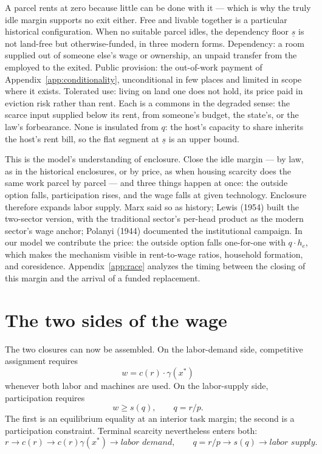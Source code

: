 \documentclass[12pt]{article}
\theoremstyle{plain}
\begin{document}
A parcel rents at zero because little can be done with it --- which is why the truly idle margin supports no exit either. Free and livable together is a particular historical configuration. When no suitable parcel idles, the dependency floor $\underline{s}$ is not land-free but otherwise-funded, in three modern forms. Dependency: a room supplied out of someone else's wage or ownership, an unpaid transfer from the employed to the exited. Public provision: the out-of-work payment of Appendix~\ref{app:conditionality}, unconditional in few places and limited in scope where it exists. Tolerated use: living on land one does not hold, its price paid in eviction risk rather than rent. Each is a commons in the degraded sense: the scarce input supplied below its rent, from someone's budget, the state's, or the law's forbearance. None is insulated from $q$: the host's capacity to share inherits the host's rent bill, so the flat segment at $\underline{s}$ is an upper bound.

This is the model's understanding of enclosure. Close the idle margin --- by law, as in the historical enclosures, or by price, as when housing scarcity does the same work parcel by parcel --- and three things happen at once: the outside option falls, participation rises, and the wage falls at given technology. Enclosure therefore expands labor supply. Marx said so as history; Lewis (1954) built the two-sector version, with the traditional sector's per-head product as the modern sector's wage anchor; Polanyi (1944) documented the institutional campaign. In our model we contribute the price: the outside option falls one-for-one with $q\cdot h_e$, which makes the mechanism visible in rent-to-wage ratios, household formation, and coresidence. Appendix~\ref{app:race} analyzes the timing between the closing of this margin and the arrival of a funded replacement.

\section{The two sides of the wage}\label{sec:interval}

The two closures can now be assembled. On the labor-demand side, competitive
assignment requires
\[
w = c(r)\cdot\gamma(x^*)
\]
whenever both labor and machines are used. On the labor-supply side,
participation requires
\[
w \ge s(q), \qquad q=r/p.
\]
The first is an equilibrium equality at
an interior task margin; the second is a participation constraint. Terminal
scarcity nevertheless enters both:
\[
r
\to c(r)
\to c(r)\gamma(x^*)
\to \textit{labor demand},
\qquad
q=r/p
\to s(q)
\to \textit{labor supply}.
\]
\end{document}

